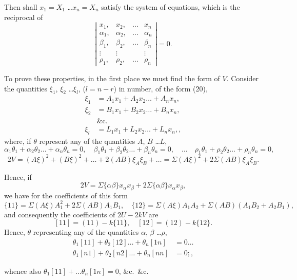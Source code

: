 \documentclass[11pt,a4paper]{book}
\begin{document}
Then shall $x_1 = X_1$ \ldots $x_n = X_n$ satisfy the system of equations, which is the reciprocal of
\[
\left|\begin{array}{cccc}
x_1, & x_2, & \ldots & x_n \\
\alpha_1, & \alpha_2, & \ldots & \alpha_n \\
\beta_1, & \beta_2, & \ldots & \beta_n \\
\vdots & \vdots & & \vdots \\
\rho_1, & \rho_2, & \ldots & \rho_n
\end{array}\right| = 0
\tag{25}.
\]

To prove these properties, in the first place we must find the form of $V$.
Consider the quantities $\xi_1$, $\xi_2$ \ldots $\xi_l$, ($l = n-r$) in number, of the form (20),
\begin{align*}
\xi_1 &= A_1 x_1 + A_2 x_2 \ldots + A_n x_n, \\
\xi_2 &= B_1 x_1 + B_2 x_2 \ldots + B_n x_n, \\
&\text{\&c.} \\
\xi_l &= L_1 x_1 + L_2 x_2 \ldots + L_n x_n,
\tag{27},
\end{align*}
where, if $\theta$ represent any of the quantities $A$, $B$ \ldots $L$,
\[
\alpha_1 \theta_1 + \alpha_2 \theta_2 \ldots + \alpha_n \theta_n = 0, \quad
\beta_1 \theta_1 + \beta_2 \theta_2 \ldots + \beta_n \theta_n = 0, \quad
\ldots \quad
\rho_1 \theta_1 + \rho_2 \theta_2 \ldots + \rho_n \theta_n = 0,
\]
\[
2V = (A\xi)^2 + (B\xi)^2 + \ldots + 2(AB)\xi_A\xi_B + \ldots = \Sigma(A\xi)^2 + 2\Sigma(AB)\xi_A\xi_B.
\]

Hence, if
\[
2V = \Sigma\{\alpha\beta\} x_\alpha x_\beta + 2\Sigma\{\alpha\beta\} x_\alpha x_\beta \tag{28},
\]
we have for the coefficients of this form
\[
\{11\} = \Sigma(A\xi) A_1^2 + 2\Sigma(AB) A_1 B_1, \quad
\{12\} = \Sigma(A\xi) A_1 A_2 + \Sigma(AB) (A_1 B_2 + A_2 B_1),
\]
and consequently the coefficients of $2U - 2kV$ are
\[
[11] = (11) - k\{11\}, \quad [12] = (12) - k\{12\}.
\]
Hence, $\theta$ representing any of the quantities $\alpha$, $\beta$ \ldots $\rho$,
\begin{align*}
\theta_1[11] + \theta_2[12] \ldots + \theta_n[1n] &= 0 \ldots \\
\theta_1[n1] + \theta_2[n2] \ldots + \theta_n[nn] &= 0;
\tag{29},
\end{align*}
\newpage

whence also $\theta_1[11] + \ldots \theta_n[1n] = 0$, \&c.\ \&c.
\end{document}
